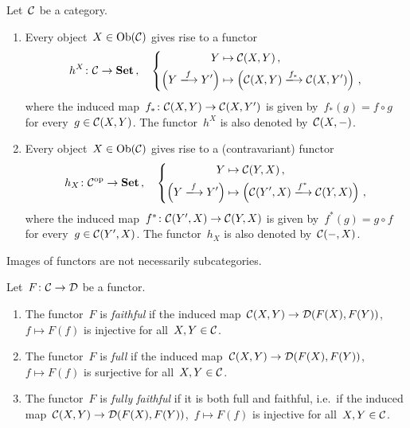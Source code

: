 \begin{example}
  Let~$\mathcal{C}$ be a category.
  \begin{enumerate}
    \item
      Every object~$X \in \operatorname{Ob}(\mathcal{C})$ gives rise to a functor
      \[
                h^X
        \colon  \Ccat
        \to     \Set \,,
        \quad   \left\{
                  \begin{aligned}
                              Y
                    &\mapsto  \Ccat(X,Y) \,,
                    \\
                              \left( Y \xlongto{f} Y' \right)
                    &\mapsto  \left( \Ccat(X,Y) \xlongto{f_*} \Ccat(X,Y') \right) \,,
                  \end{aligned}
                \right.
      \]
      where the induced map~$f_* \colon \mathcal{C}(X,Y) \to \mathcal{C}(X,Y')$ is given by~$f_*(g) = f \circ g$ for every~$g \in \mathcal{C}(X,Y)$.
      The functor~$h^X$ is also denoted by~$\mathcal{C}(X,-)$.
    \item
      Every object~$X \in \operatorname{Ob}(\mathcal{C})$ gives rise to a (contravariant) functor
      \[
                h_X
        \colon  \Ccat^\op
        \to     \Set \,,
        \quad   \left\{
                  \begin{aligned}
                              Y
                    &\mapsto  \Ccat(Y,X) \,,
                    \\
                              \left( Y \xlongto{f} Y' \right)
                    &\mapsto  \left( \Ccat(Y',X) \xlongto{f^*} \Ccat(Y,X) \right) \,,
                  \end{aligned}
                \right.
      \]
      where the induced map~$f^* \colon \mathcal{C}(Y',X) \to \mathcal{C}(Y,X)$ is given by~$f^*(g) = g \circ f$ for every~$g \in \mathcal{C}(Y',X)$.
      The functor~$h_X$ is also denoted by~$\mathcal{C}(-,X)$.
  \end{enumerate}
\end{example}


\begin{warning*}
  Images of functors are not necessarily subcategories.
\end{warning*}


\begin{definition}[label=properties of functors]
  Let~$F \colon \mathcal{C} \to \mathcal{D}$ be a functor.
  \begin{enumerate}
    \item
      The functor~$F$ is \emph{faithful} if the induced map~$\mathcal{C}(X,Y) \to \mathcal{D}(F(X),F(Y))$,~$f \mapsto F(f)$ is injective for all~$X, Y \in \mathcal{C}$.
    \item
      The functor~$F$ is \emph{full} if the induced map~$\mathcal{C}(X,Y) \to \mathcal{D}(F(X),F(Y))$,~$f \mapsto F(f)$ is surjective for all~$X, Y \in \mathcal{C}$.
    \item
      The functor~$F$ is \emph{fully faithful} if it is both full and faithful, i.e.\ if the induced map~$\mathcal{C}(X,Y) \to \mathcal{D}(F(X),F(Y))$,~$f \mapsto F(f)$ is injective for all~$X, Y \in \mathcal{C}$.
  \end{enumerate}
\end{definition}



